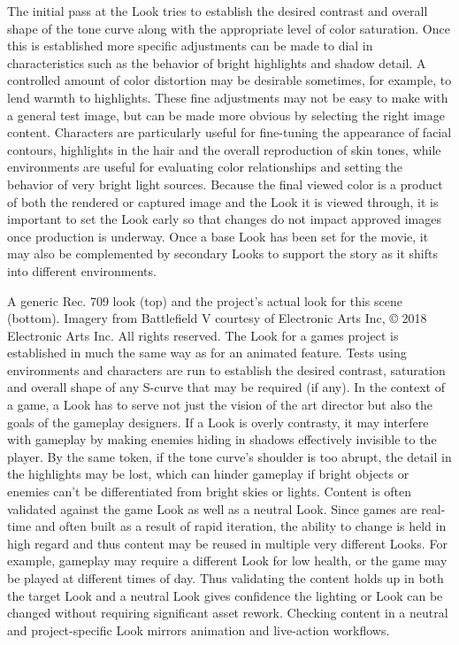 The initial pass at the Look tries to establish the desired contrast and overall shape of the tone curve along with the appropriate level of color saturation. Once this is established more specific adjustments can be made to dial in characteristics such as the behavior of bright highlights and shadow detail. A controlled amount of color distortion may be desirable sometimes, for example, to lend warmth to highlights. These fine adjustments may not be easy to make with a general test image, but can be made more obvious by selecting the right image content. Characters are particularly useful for fine-tuning the appearance of facial contours, highlights in the hair and the overall reproduction of skin tones, while environments are useful for evaluating color relationships and setting the behavior of very bright light sources. Because the final viewed color is a product of both the rendered or captured image and the Look it is viewed through, it is important to set the Look early so that changes do not impact approved images once production is underway. Once a base Look has been set for the movie, it may also be complemented by secondary Looks to support the story as it shifts into different environments.




A generic Rec. 709 look (top) and the project’s actual look for this scene (bottom). 
Imagery from Battlefield V courtesy of Electronic Arts Inc, © 2018 Electronic Arts Inc. All rights reserved.
The Look for a games project is established in much the same way as for an animated feature. Tests using environments and characters are run to establish the desired contrast, saturation and overall shape of any S-curve that may be required (if any). In the context of a game, a Look has to serve not just the vision of the art director but also the goals of the gameplay designers. If a Look is overly contrasty, it may interfere with gameplay by making enemies hiding in shadows effectively invisible to the player. By the same token, if the tone curve’s shoulder is too abrupt, the detail in the highlights may be lost, which can hinder gameplay if bright objects or enemies can’t be differentiated from bright skies or lights. Content is often validated against the game Look as well as a neutral Look. Since games are real-time and often built as a result of rapid iteration, the ability to change is held in high regard and thus content may be reused in multiple very different Looks. For example, gameplay may require a different Look for low health, or the game may be played at different times of day. Thus validating the content holds up in both the target Look and a neutral Look gives confidence the lighting or Look can be changed without requiring significant asset rework. Checking content in a neutral and project-specific Look mirrors animation and live-action workflows.

